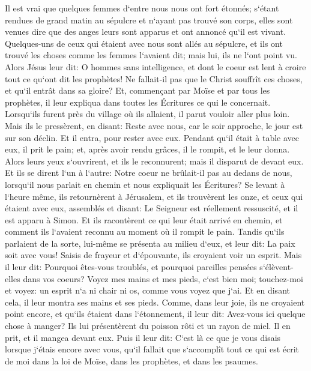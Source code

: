 \verse Il est vrai que quelques femmes d`entre nous nous ont fort étonnés; s`étant rendues de grand matin au sépulcre 
\verse et n`ayant pas trouvé son corps, elles sont venues dire que des anges leurs sont apparus et ont annoncé qu`il est vivant. 
\verse Quelques-uns de ceux qui étaient avec nous sont allés au sépulcre, et ils ont trouvé les choses comme les femmes l`avaient dit; mais lui, ils ne l`ont point vu. 
\verse Alors Jésus leur dit: O hommes sans intelligence, et dont le coeur est lent à croire tout ce qu`ont dit les prophètes! 
\verse Ne fallait-il pas que le Christ souffrît ces choses, et qu`il entrât dans sa gloire? 
\verse Et, commençant par Moïse et par tous les prophètes, il leur expliqua dans toutes les Écritures ce qui le concernait. 
\verse Lorsqu`ils furent près du village où ils allaient, il parut vouloir aller plus loin. 
\verse Mais ils le pressèrent, en disant: Reste avec nous, car le soir approche, le jour est sur son déclin. Et il entra, pour rester avec eux. 
\verse Pendant qu`il était à table avec eux, il prit le pain; et, après avoir rendu grâces, il le rompit, et le leur donna. 
\verse Alors leurs yeux s`ouvrirent, et ils le reconnurent; mais il disparut de devant eux. 
\verse Et ils se dirent l`un à l`autre: Notre coeur ne brûlait-il pas au dedans de nous, lorsqu`il nous parlait en chemin et nous expliquait les Écritures? 
\verse Se levant à l`heure même, ils retournèrent à Jérusalem, et ils trouvèrent les onze, et ceux qui étaient avec eux, assemblés 
\verse et disant: Le Seigneur est réellement ressuscité, et il est apparu à Simon. 
\verse Et ils racontèrent ce qui leur était arrivé en chemin, et comment ils l`avaient reconnu au moment où il rompit le pain. 
\verse Tandis qu`ils parlaient de la sorte, lui-même se présenta au milieu d`eux, et leur dit: La paix soit avec vous! 
\verse Saisis de frayeur et d`épouvante, ils croyaient voir un esprit. 
\verse Mais il leur dit: Pourquoi êtes-vous troublés, et pourquoi pareilles pensées s`élèvent-elles dans vos coeurs? 
\verse Voyez mes mains et mes pieds, c`est bien moi; touchez-moi et voyez: un esprit n`a ni chair ni os, comme vous voyez que j`ai. 
\verse Et en disant cela, il leur montra ses mains et ses pieds. 
\verse Comme, dans leur joie, ils ne croyaient point encore, et qu`ils étaient dans l`étonnement, il leur dit: Avez-vous ici quelque chose à manger? 
\verse Ils lui présentèrent du poisson rôti et un rayon de miel. 
\verse Il en prit, et il mangea devant eux. 
\verse Puis il leur dit: C`est là ce que je vous disais lorsque j`étais encore avec vous, qu`il fallait que s`accomplît tout ce qui est écrit de moi dans la loi de Moïse, dans les prophètes, et dans les psaumes. 

